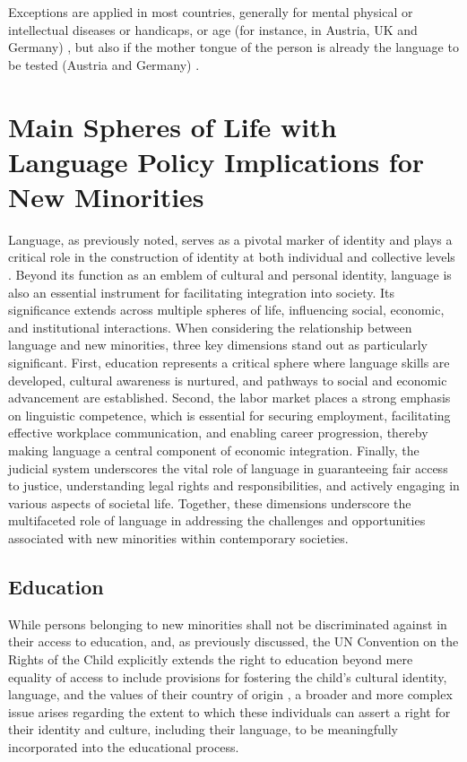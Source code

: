 \documentclass[output=paper,colorlinks,citecolor=brown]{langscibook}
\begin{document}
Exceptions are applied in most countries, generally for mental physical or intellectual diseases or handicaps, or age (for instance, in Austria, UK and Germany) \citep{guild_groenendijk_carrera2009}, but also if the mother tongue of the person is already the language to be tested (Austria and Germany) \citep{guild_groenendijk_carrera2009}.

\section{Main Spheres of Life with Language Policy Implications for New Minorities  }\label{ch2.4.ss.4}

Language, as previously noted, serves as a pivotal marker of identity and plays a critical role in the construction of identity at both individual and collective levels \citep{acfc2012}. Beyond its function as an emblem of cultural and personal identity, language is also an essential instrument for facilitating integration into society. Its significance extends across multiple spheres of life, influencing social, economic, and institutional interactions. When considering the relationship between language and new minorities, three key dimensions stand out as particularly significant. First, education represents a critical sphere where language skills are developed, cultural awareness is nurtured, and pathways to social and economic advancement are established. Second, the labor market places a strong emphasis on linguistic competence, which is essential for securing employment, facilitating effective workplace communication, and enabling career progression, thereby making language a central component of economic integration. Finally, the judicial system underscores the vital role of language in guaranteeing fair access to justice, understanding legal rights and responsibilities, and actively engaging in various aspects of societal life. Together, these dimensions underscore the multifaceted role of language in addressing the challenges and opportunities associated with new minorities within contemporary societies.

\subsection{Education }\label{ch2.4.ss.4.1}

While persons belonging to new minorities shall not be discriminated against in their access to education, and, as previously discussed, the UN Convention on the Rights of the Child explicitly extends the right to education beyond mere equality of access to include provisions for fostering the child's cultural identity, language, and the values of their country of origin \citep{liefaard_sloth-nielsen2017,tobin2019}, a broader and more complex issue arises regarding the extent to which these individuals can assert a right for their identity and culture, including their language, to be meaningfully incorporated into the educational process.
\end{document}
